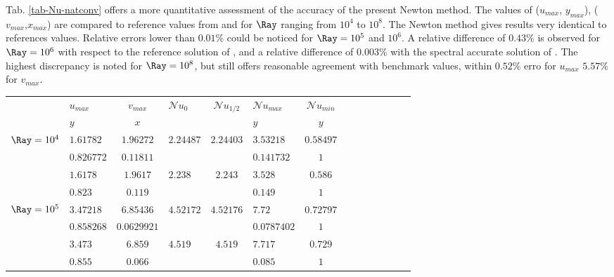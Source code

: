 Tab. \ref{tab-Nu-natconv} offers a more quantitative assessment of the accuracy of the present Newton method. 
The values of ($u_{max}$, $y_{max}$), ($v_{max}$,$x_{max}$) are compared to reference values from \cite{de1983natural}  and \cite{LeQuere91} for $\Ray$ ranging from $10^4$ to $10^8$.
The Newton method gives results very identical to references values.
Relative errors lower than $0.01 \%$ could be noticed for $\Ray=10^5$ and $10^6$.
A relative difference of $0.43 \%$ is observed for $\Ray = 10^6$ with respect to the reference solution of \cite{de1983natural}, and a relative difference of $0.003 \%$ with the spectral accurate solution of \cite{LeQuere91}.
The highest discrepancy is noted for $\Ray = 10^8$, but still offers reasonable agreement with benchmark values, within $0.52 \%$ erro for $u_{max}$  $5.57 \%$ for $v_{max}$.
\begin{table}
   \begin{center}
      \begin{tabular}{*{7}{cl}}
          & $u_{max}$ & $v_{max}$ & \multirow{2}{*}{$\mathcal{N}\!u_0$} & \multirow{2}{*}{$\mathcal{N}\!u_{1/2}$} & $\mathcal{N}\!u_{max}$ & $\mathcal{N}\!u_{min}$ \\ 
          & $y$ & $x$ & &  & $y$ & $y$ \\ \bottomrule
          \multirow{2}{*}{$\Ray = 10^4$} & $1.61782$ & $1.96272$ & \multirow{2}{*}{$2.24487$} & \multirow{2}{*}{$2.24403 $} & $3.53218$ & $0.58497$  \\
          & $0.826772$ & $0.11811$ & & & $0.141732$ & $1$ \\
          \multirow{2}{*}{\cite{de1983natural}} & $1.6178$ & $1.9617$ & $2.238$ & $2.243 $ & $3.528$ & $0.586$  \\
          & $0.823$ & $0.119$ & & & $0.149$ & $1$ \\ \hline
           
          \multirow{2}{*}{$\Ray = 10^5$} & $3.47218$ & $6.85436$ & \multirow{2}{*}{$4.52172$} & \multirow{2}{*}{$4.52176 $} & $7.72$ & $0.72797$  \\
          & $0.858268$ & $0.0629921$ & & & $0.0787402$ & $1$ \\
         \multirow{2}{*}{\cite{de1983natural}} & $3.473$ & $6.859$ & \multirow{2}{*}{$4.519$} & \multirow{2}{*}{$4.519 $} & $7.717$ & $0.729$  \\
         & $0.855$ & $0.066$ & & & $0.085$ & $1$ \\ \hline
         

\end{tabular}
\end{center}
\end{table}

